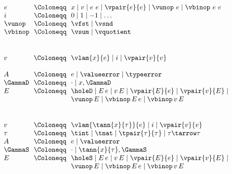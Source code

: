 \begin{flushleft}

\begin{minipage}[t]{0.75\columnwidth}
\\
$\begin{array}{l@{~~}c@{~~}l}
  e & \Coloneqq & x \mid v \mid e~e \mid \vpair{e}{e} \mid \vunop~e \mid \vbinop~e~e
\\
  i & \Coloneqq & 0 \mid 1 \mid -1 \mid \ldots
\\
  \vunop & \Coloneqq & \vfst \mid \vsnd
\\
  \vbinop & \Coloneqq & \vsum \mid \vquotient
\end{array}$
\end{minipage}%
\begin{minipage}[t]{0.7\columnwidth}
\\
$\begin{array}{l@{~~}c@{~~}l}
  v & \Coloneqq & \vlam{x}{e} \mid i \mid \vpair{v}{v}
\\ & &
\\
  A & \Coloneqq & e \mid \valueerror \mid \typeerror
\\
  \GammaD & \Coloneqq & \cdot \mid x,\GammaD
\\
  E & \Coloneqq & \holeD \mid E\,e \mid v\,E \mid \vpair{E}{e} \mid \vpair{v}{E} \mid
\\ & & \vunop\,E \mid \vbinop\,E\,e \mid \vbinop\,v\,E
\end{array}$
\end{minipage}%
\begin{minipage}[t]{0.7\columnwidth}
\\
$\begin{array}{l@{~~}c@{~~}l}
  v & \Coloneqq & \vlam{\tann{x}{\tau}}{e} \mid i \mid \vpair{v}{v}
\\
  \tau & \Coloneqq & \tint \mid \tnat \mid \tpair{\tau}{\tau} \mid \tau \tarrow \tau
\\
  A & \Coloneqq & e \mid \valueerror
\\
  \GammaS & \Coloneqq & \cdot \mid \tann{x}{\tau},\GammaS
\\
  E & \Coloneqq & \holeS \mid E\,e \mid v\,E \mid \vpair{E}{e} \mid \vpair{v}{E} \mid
\\ & & \vunop\,E \mid \vbinop\,E\,e \mid \vbinop\,v\,E
\end{array}$
\end{minipage}

\medskip
\begin{minipage}[t]{\columnwidth}
\begin{mathpar}


\end{mathpar}
\end{minipage}
\end{flushleft}
